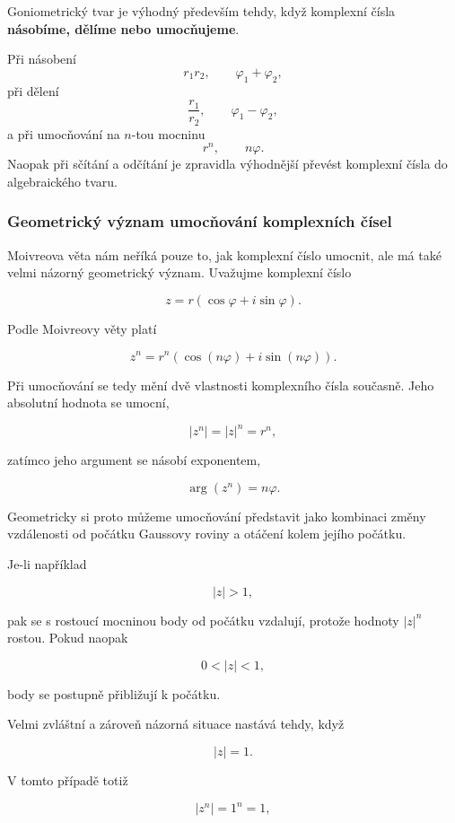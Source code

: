 \documentclass[12pt,a4paper]{article}
\begin{document}
\begin{notebox}
    Goniometrický tvar je výhodný především tehdy, když komplexní čísla
    \textbf{násobíme, dělíme nebo umocňujeme}.
    
    Při násobení
    \[
        r_1r_2, \qquad \varphi_1+\varphi_2,
    \]
    při dělení
    \[
        \frac{r_1}{r_2}, \qquad \varphi_1-\varphi_2,
    \]
    a při umocňování na $n$-tou mocninu
    \[
        r^n, \qquad n\varphi.
    \]
    Naopak při sčítání a odčítání je zpravidla výhodnější převést komplexní čísla
    do algebraického tvaru.
\end{notebox}


\subsubsection*{Geometrický význam umocňování komplexních čísel}

Moivreova věta nám neříká pouze to, jak komplexní číslo umocnit, ale má také
velmi názorný geometrický význam. Uvažujme komplexní číslo

\[
    z=r\left(\cos\varphi+i\sin\varphi\right).
\]

Podle Moivreovy věty platí

\[
    z^n
    =
    r^n
    \left(
        \cos(n\varphi)
        +
        i\sin(n\varphi)
    \right).
\]

Při umocňování se tedy mění dvě vlastnosti komplexního čísla současně. Jeho
absolutní hodnota se umocní,

\[
    |z^n|=|z|^n=r^n,
\]

zatímco jeho argument se násobí exponentem,

\[
    \arg(z^n)=n\varphi.
\]

Geometricky si proto můžeme umocňování představit jako kombinaci změny vzdálenosti
od počátku Gaussovy roviny a otáčení kolem jejího počátku.

Je-li například

\[
    |z|>1,
\]

pak se s rostoucí mocninou body od počátku vzdalují, protože hodnoty $|z|^n$
rostou. Pokud naopak

\[
    0<|z|<1,
\]

body se postupně přibližují k počátku.

Velmi zvláštní a zároveň názorná situace nastává tehdy, když

\[
    |z|=1.
\]

V tomto případě totiž

\[
    |z^n|=1^n=1,
\]
\end{document}

